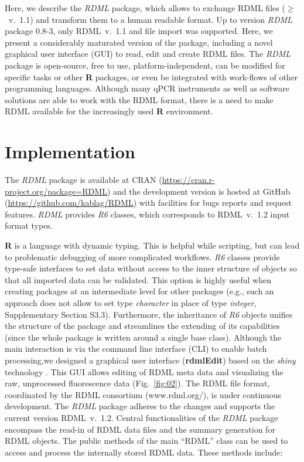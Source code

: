 \documentclass{bioinfo}
\begin{document}
Here, we describe the \textit{RDML} package, which 
allows to exchange RDML files ($\geq$~v.~1.1) and transform them to  a human 
readable format.  Up to version \textit{RDML} package 0.8-3, only RDML~v.~1.1 and 
file import was supported. Here, we present a considerably maturated version of 
the package, including a novel graphical user interface (GUI) to read, edit and create RDML files. The \textit{RDML} package is open-source, free to use, 
platform-independent, can be modified for specific tasks or other 
\textbf{R} packages, or even be integrated  with work-flows  of other programming 
languages.  Although many qPCR instruments as well as software solutions are able 
to work with the RDML format, there is a need to make RDML available for the increasingly 
used \textbf{R} environment.

\section{Implementation}
The \textit{RDML} package is available at CRAN 
(\url{https://cran.r-project.org/package=RDML}) and the 
development version is hosted at GitHub (\url{https://github.com/kablag/RDML}) 
with facilities for bugs reports and request features. \textit{RDML} provides 
\emph{R6} classes, which corresponds to RDML~v.~1.2 input format types. 



\textbf{R} 
is a language with dynamic typing. This is helpful while scripting, but can lead 
to problematic debugging of more complicated workflows. \emph{R6} classes 
provide type-safe interfaces to set data without access to the inner structure of 
objects so that all imported data can be validated. This option is  highly useful when 
creating packages  at an intermediate level for other packages (e.g., such an
approach does not allow to set type \emph{character} in place of type \emph{integer}, 
Supplementary Section S3.3). Furthermore, the inheritance of \emph{R6} objects 
unifies the structure of the package and streamlines the extending of its capabilities 
(since the whole package is written around a single base class). Although the main interaction 
is via the command line interface (CLI) to enable batch processing,we designed  a graphical user
interface (\textbf{rdmlEdit}) based on the \textit{shiny} technology  \cite{roediger2015chippcr}. This GUI allows editing  of RDML meta data and  visualizing the raw, unprocessed fluorescence data
(Fig.~\ref{fig:02}). The RDML file format, coordinated by the RDML consortium (www.rdml.org/), is under continuous development. The \textit{RDML} 
package  adheres to the changes and supports the current version RDML~v.~1.2. 
Central functionalities of the \textit{RDML} package encompass the read-in of RDML  
data files and the summary generation for RDML objects. The public methods of the main  “RDML” class can be used 
to access and process the internally stored RDML data. These methods include:
\end{document}
